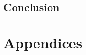 \documentclass[a4paper]{article}
\begin{document}
\subsection{Conclusion}

\section{Appendices}
\end{document}
